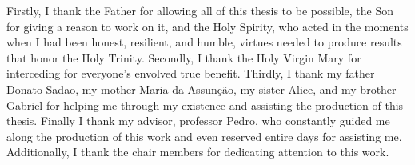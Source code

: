 Firstly, I thank the Father for allowing all of this thesis to be possible, the Son for giving a reason to work on it, and the Holy Spirity, who acted in the moments when I had been honest, resilient, and humble, virtues needed to produce results that honor the Holy Trinity. Secondly, I thank the Holy Virgin Mary for interceding for everyone's envolved true benefit. Thirdly, I thank my father Donato Sadao, my mother Maria da Assunção, my sister Alice, and my brother Gabriel for helping me through my existence and assisting the production of this thesis. Finally I thank my advisor, professor Pedro, who constantly guided me along the production of this work and even reserved entire days for assisting me. Additionally, I thank the chair members for dedicating attention to this work.
